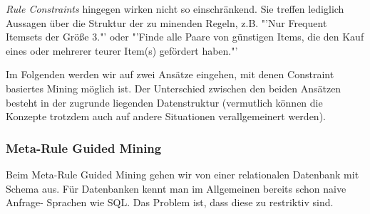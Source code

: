 \textit{Rule Constraints} hingegen wirken nicht so
einschränkend. Sie treffen lediglich Aussagen über die
Struktur der zu minenden Regeln, z.B. "'Nur Frequent Itemsets
der Größe 3."' oder "'Finde alle Paare von günstigen Items, 
die den Kauf eines oder mehrerer teurer
Item(s) gefördert haben."'

Im Folgenden werden wir auf zwei Ansätze eingehen, mit
denen Constraint basiertes Mining möglich ist. Der
Unterschied zwischen den beiden Ansätzen besteht in der
zugrunde liegenden Datenstruktur (vermutlich können
die Konzepte trotzdem auch auf andere Situationen 
verallgemeinert werden).

\subsubsection{Meta-Rule Guided Mining}
Beim Meta-Rule Guided Mining gehen wir von einer
relationalen Datenbank mit Schema aus. Für Datenbanken
kennt man im Allgemeinen bereits schon naive Anfrage-
Sprachen wie SQL. Das Problem ist, dass diese zu restriktiv
sind. 

